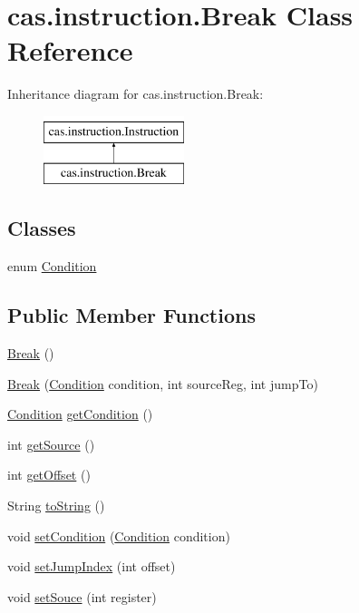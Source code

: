 \hypertarget{classcas_1_1instruction_1_1_break}{\section{cas.\-instruction.\-Break Class Reference}
\label{classcas_1_1instruction_1_1_break}
}
Inheritance diagram for cas.\-instruction.\-Break\-:\begin{figure}[H]
\begin{center}
\leavevmode
\includegraphics[height=2.000000cm]{classcas_1_1instruction_1_1_break}
\end{center}
\end{figure}
\subsection*{Classes}
\begin{DoxyCompactItemize}
\item 
enum \hyperlink{enumcas_1_1instruction_1_1_break_1_1_condition}{Condition}
\end{DoxyCompactItemize}
\subsection*{Public Member Functions}
\begin{DoxyCompactItemize}
\item 
\hyperlink{classcas_1_1instruction_1_1_break_a8bb03ff69ea5fcdb6ca65592a83bba7a}{Break} ()
\item 
\hyperlink{classcas_1_1instruction_1_1_break_a46af18ace0ccff16766c9e2d0125d50f}{Break} (\hyperlink{enumcas_1_1instruction_1_1_break_1_1_condition}{Condition} condition, int source\-Reg, int jump\-To)
\item 
\hyperlink{enumcas_1_1instruction_1_1_break_1_1_condition}{Condition} \hyperlink{classcas_1_1instruction_1_1_break_a9f8f8d465c12b17f10d2563a7ed5f3ff}{get\-Condition} ()
\item 
int \hyperlink{classcas_1_1instruction_1_1_break_ae7304e16507fc9365a3e6d0bfe224b1b}{get\-Source} ()
\item 
int \hyperlink{classcas_1_1instruction_1_1_break_a3be3ac780c73fd9a31e7cc740f40b475}{get\-Offset} ()
\item 
String \hyperlink{classcas_1_1instruction_1_1_break_a3403130e65dafa6b1db3e7524836e6ae}{to\-String} ()
\item 
void \hyperlink{classcas_1_1instruction_1_1_break_ad25ef55cc8c7c6cc5776cd08cf6b0e78}{set\-Condition} (\hyperlink{enumcas_1_1instruction_1_1_break_1_1_condition}{Condition} condition)
\item 
void \hyperlink{classcas_1_1instruction_1_1_break_ac7311832c23abf2dc3e881b78803291c}{set\-Jump\-Index} (int offset)
\item 
void \hyperlink{classcas_1_1instruction_1_1_break_aadc3c672af83c33bdf50bcdbbb22b8a7}{set\-Souce} (int register)
\end{DoxyCompactItemize}


